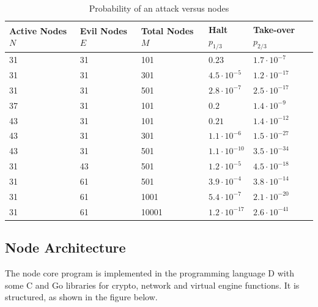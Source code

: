 \begin{table}[H]
	\begin{center}
		\begin{tabular}{|p{2.2cm}|p{2.2cm}|p{2.4cm}|p{2.4cm}|p{2.4cm}|}
			\hline
			Active Nodes $N$ & Evil Nodes $E$ & Total Nodes $M$ & Halt $p_{1/3}$ & Take-over $p_{2/3}$ \\
			\hline
			31 & 31 & 101 & $0.23$ & $1.7 \cdot 10^{-7}$ \\
			\hline
			31 & 31 & 301 & $4.5 \cdot 10^{-5}$ & $1.2 \cdot 10^{-17}$ \\
			\hline
			31 & 31 & 501 & $2.8 \cdot 10^{-7}$ & $2.5 \cdot 10^{-17}$ \\
			\hline
			37 & 31 & 101 & $0.2 $ & $1.4 \cdot 10^{-9}$ \\
			\hline
			43 & 31 & 101 & $0.21 $ & $1.4 \cdot 10^{-12}$ \\
			\hline
			43 & 31 & 301 & $1.1 \cdot 10^{-6} $ & $1.5 \cdot 10^{-27}$ \\
			\hline
			43 & 31 & 501 & $1.1 \cdot 10^{-10} $ & $3.5 \cdot 10^{-34}$ \\
			\hline
			31 & 43 & 501 & $1.2 \cdot 10^{-5} $ & $4.5 \cdot 10^{-18}$ \\
			\hline
			31 & 61 & 501 & $3.9 \cdot 10^{-4} $ & $3.8 \cdot 10^{-14}$ \\
			\hline
			31 & 61 & 1001 & $5.4 \cdot 10^{-7} $ & $2.1 \cdot 10^{-20}$ \\
			\hline
			31 & 61 & 10001 & $1.2 \cdot 10^{-17} $ & $2.6 \cdot 10^{-41}$ \\
			\hline
		\end{tabular}
	\end{center}
	\caption{Probability of an attack versus nodes} 
	\label{tab:network_attack}
\end{table}

\subsection{Node Architecture}
The node core program is implemented in the programming language D with some C and Go libraries for crypto, network and virtual engine functions. It is structured, as shown in the figure below. 

